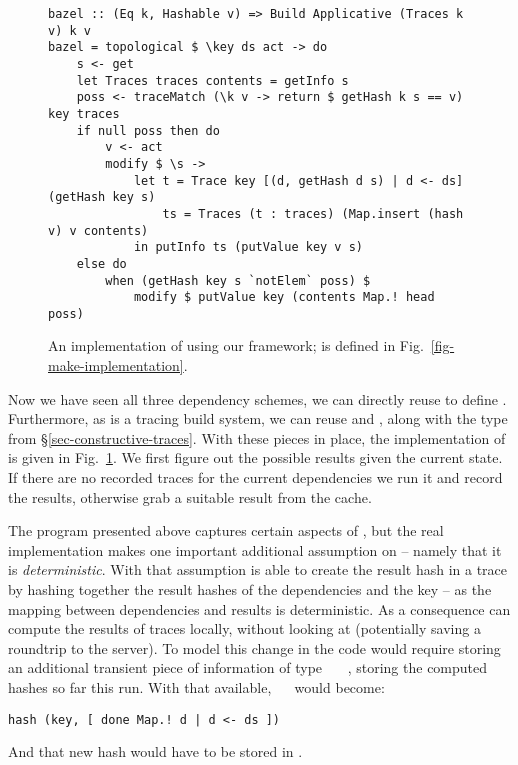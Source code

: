 \begin{figure}
\begin{verbatim}
bazel :: (Eq k, Hashable v) => Build Applicative (Traces k v) k v
bazel = topological $ \key ds act -> do
    s <- get
    let Traces traces contents = getInfo s
    poss <- traceMatch (\k v -> return $ getHash k s == v) key traces
    if null poss then do
        v <- act
        modify $ \s ->
            let t = Trace key [(d, getHash d s) | d <- ds] (getHash key s)
                ts = Traces (t : traces) (Map.insert (hash v) v contents)
            in putInfo ts (putValue key v s)
    else do
        when (getHash key s `notElem` poss) $
            modify $ putValue key (contents Map.! head poss)
\end{verbatim}
\vspace{-2mm}
\caption{An implementation of \Bazel using our framework;  is
defined in Fig.~\ref{fig-make-implementation}.}\label{fig-bazel-implementation}
\vspace{-2mm}
\end{figure}

Now we have seen all three dependency schemes, we can directly reuse  to define \Bazel. Furthermore, as \Bazel is a tracing build system, we can reuse  and , along with the  type from \S\ref{sec-constructive-traces}. With these pieces in place, the implementation of \Bazel is given in Fig.~\ref{fig-bazel-implementation}. We first figure out the possible results given the current state. If there are no recorded traces for the current dependencies we run it and record the results, otherwise grab a suitable result from the  cache.

The program presented above captures certain aspects of \Bazel, but the real implementation makes one important additional assumption on  -- namely that it is \textit{deterministic}. With that assumption \Bazel is able to create the result hash in a trace by hashing together the result hashes of the dependencies and the key -- as the mapping between dependencies and results is deterministic. As a consequence \Bazel can compute the results of traces locally, without looking at  (potentially saving a roundtrip to the server). To model this change in the code would require storing an additional transient piece of information  of type ~~~, storing the computed hashes so far this run. With that available, ~~ would become:
\begin{verbatim}
hash (key, [ done Map.! d | d <- ds ])
\end{verbatim}
And that new hash would have to be stored in .

